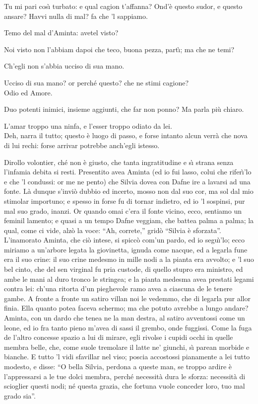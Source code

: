 \documentclass{book}
\begin{document}
   \9 Tu mi pari
	cos\`{\i} turbato: e qual cagion t'affanna?
	Ond'\`e questo sudor, e questo ansare?
	Havvi nulla di mal? fa che 'l sappiamo.

	\5 Temo del mal d'Aminta: avetel visto?

	\9 Noi visto non l'abbiam dapoi che teco,
	buona pezza, part\`{\i}; ma che ne temi?

	\5 Ch'egli non s'abbia ucciso di sua mano.

	\9 Ucciso di sua mano? or perch\'e questo?
	che ne stimi cagione? \\

   \5 Odio ed Amore.

	\9 Duo potenti inimici, insieme aggiunti,
	che far non ponno? Ma parla pi\`u chiaro.

	\5 L'amar troppo una ninfa, e l'esser troppo
	odiato da lei. \\

   \9 Deh, narra il tutto;
	questo \`e luogo di passo, e forse intanto
	alcun verr\`a che nova di lui rechi:
	forse arrivar potrebbe anch'egli istesso.

	\5 Dirollo volontier, ch\'e non \`e giusto,
	che tanta ingratitudine e s\`{\i} strana
	senza l'infamia debita si resti.
	Presentito avea Aminta (ed io fui lasso,
	colui che rifer\`{\i}'lo e che 'l condussi:
	or me ne pento) che Silvia dovea
	con Dafne ire a lavarsi ad una fonte.
	L\`a dunque s'invi\`o dubbio ed incerto,
	mosso non dal suo cor, ma sol dal mio
	stimolar importuno; e spesso in forse
	fu di tornar indietro, ed io 'l sospinsi,
	pur mal suo grado, inanzi. Or quando omai
	c'era il fonte vicino, ecco, sentiamo
	un feminil lamento; e quasi a un tempo
	Dafne veggiam, che battea palma a palma;
	la qual, come ci vide, alz\`o la voce:
	``Ah, correte,'' grid\`o ``Silvia \`e sforzata''.
	L'inamorato Aminta, che ci\`o intese,
	si spicc\`o com'un pardo, ed io segu\`{\i}'lo;
	ecco miriamo a un'arbore legata
	la giovinetta, ignuda come nacque,
	ed a legarla fune era il suo crine:
	il suo crine medesmo in mille nodi
	a la pianta era avvolto; e 'l suo bel cinto,
	che del sen virginal fu pria custode,
	di quello stupro era ministro, ed ambe
	le mani al duro tronco le stringea;
	e la pianta medesma avea prestati
	legami contra lei: ch'una ritorta
	d'un pieghevole ramo avea a ciascuna
	de le tenere gambe. A fronte a fronte
	un satiro villan noi le vedemmo,
	che di legarla pur allor finia.
	Ella quanto potea faceva schermo;
	ma che potuto avrebbe a lungo andare?
	Aminta, con un dardo che tenea
	ne la man destra, al satiro avventossi
	come un leone, ed io fra tanto pieno
	m'avea di sassi il grembo, onde fuggissi.
	Come la fuga de l'altro concesse
	spazio a lui di mirare, egli rivolse
	i cupidi occhi in quelle membra belle,
	che, come suole tremolare il latte
	ne' giunchi, s\`{\i} parean morbide e bianche.
	E tutto 'l vidi sfavillar nel viso;
	poscia accostossi pianamente a lei
	tutto modesto, e disse: ``O bella Silvia,
	perdona a queste man, se troppo ardire
	\`e l'appressarsi a le tue dolci membra,
	perch\'e necessit\`a dura le sforza:
	necessit\`a di scioglier questi nodi;
	n\'e questa grazia, che fortuna vuole
	conceder loro, tuo mal grado sia''.
\end{document}
